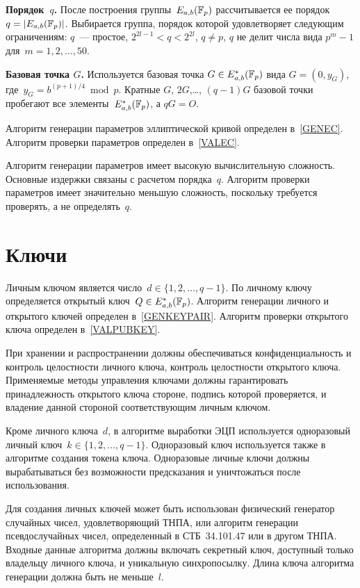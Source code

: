 {\bf Порядок~$q$.}
После построения группы~$E_{a,b}(\mathbb{F}_p)$ рассчитывается 
ее порядок~$q=|E_{a,b}(\mathbb{F}_p)|$.
%
Выбирается группа, порядок которой удовлетворяет следующим ограничениям:
$q$~--- простое,
$2^{2l-1}<q<2^{2l}$,
$q\neq p$,
$q$ не делит числа вида $p^m-1$ для~$m=1,2,\ldots,50$.

{\bf Базовая точка $G$.}
Используется базовая
точка $G\in E_{a,b}^*(\mathbb{F}_p)$ вида $G=(0,y_G)$,
где~$y_G=b^{(p+1)/4}\bmod{p}$.
%
Кратные $G$, $2G$,\ldots, $(q-1)G$ базовой точки
пробегают все элементы~$E_{a,b}^*(\mathbb{F}_p)$, а $qG=O$.

Алгоритм генерации параметров эллиптической кривой определен в~\ref{GENEC}. 
Алгоритм проверки параметров определен в~\ref{VALEC}. 

\begin{note*}
Алгоритм генерации параметров имеет высокую вычислительную сложность. Основные
издержки связаны с расчетом порядка~$q$.
%
Алгоритм проверки параметров имеет значительно меньшую сложность, поскольку
требуется проверять, а не определять~$q$.
\end{note*}

\section{Ключи}\label{COMMON.Keys}

Личным ключом является число~$d\in\{1,2,\ldots,q-1\}$.
По личному ключу определяется открытый ключ~$Q\in E_{a,b}^*(\mathbb{F}_p)$.
Алгоритм генерации личного и открытого ключей определен в~\ref{GENKEYPAIR}.
Алгоритм проверки открытого ключа определен в~\ref{VALPUBKEY}.

При хранении и распространении
должны обеспечиваться конфиденциальность и контроль целостности личного 
ключа, контроль целостности открытого ключа.
%
Применяемые методы управления ключами должны 
гарантировать принадлежность открытого ключа стороне, 
подпись которой проверяется, и владение данной стороной 
соответствующим личным ключом.

Кроме личного ключа~$d$, в алгоритме выработки ЭЦП 
используется одноразовый личный ключ~$k\in\{1,2,\ldots,q-1\}$.
Одноразовый ключ используется также в алгоритме создания токена ключа.
Одноразовые личные ключи должны вырабатываться без возможности 
предсказания и уничтожаться после использования.

Для создания личных ключей может быть использован 
физический генератор случайных чисел, удовлетворяющий ТНПА,
или алгоритм генерации псевдослучайных чисел,
определенный в СТБ~34.101.47 или в другом ТНПА. 
Входные данные алгоритма должны включать секретный ключ,
доступный только владельцу личного ключа, и уникальную 
синхропосылку. Длина ключа алгоритма генерации должна быть не меньше~$l$.

